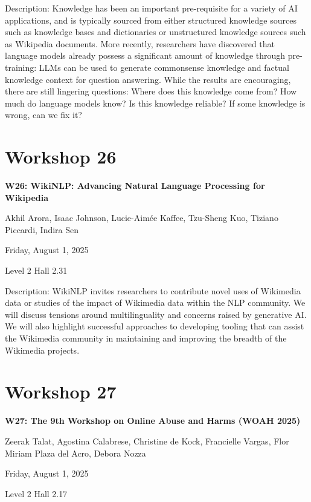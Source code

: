 Description: Knowledge has been an important pre-requisite for a variety of AI applications, and is typically sourced from either structured knowledge sources such as knowledge bases and dictionaries or unstructured knowledge sources such as Wikipedia documents. More recently, researchers have discovered that language models already possess a significant amount of knowledge through pre-training: LLMs can be used to generate commonsense knowledge and factual knowledge context for question answering. While the results are encouraging, there are still lingering questions: Where does this knowledge come from? How much do language models know? Is this knowledge reliable? If some knowledge is wrong, can we fix it?

\clearpage


\section[W26: WikiNLP: Advancing Natural Language Processing for Wikipedia]{Workshop 26}

\begin{center}
    {\Large \textbf{W26: WikiNLP: Advancing Natural Language Processing for Wikipedia}}

Akhil Arora, Isaac Johnson, Lucie-Aimée Kaffee, Tzu-Sheng Kuo, Tiziano Piccardi, Indira Sen

    Friday, August 1, 2025

Level 2 Hall 2.31
    
\end{center}

Description: WikiNLP invites researchers to contribute novel uses of Wikimedia data or studies of the impact of Wikimedia data within the NLP community. We will discuss tensions around multilinguality and concerns raised by generative AI. We will also highlight successful approaches to developing tooling that can assist the Wikimedia community in maintaining and improving the breadth of the Wikimedia projects.

\clearpage


\section[W27: The 9th Workshop on Online Abuse and Harms (WOAH 2025) ]{Workshop 27}

\begin{center}
    {\Large \textbf{W27: The 9th Workshop on Online Abuse and Harms (WOAH 2025) }}

Zeerak Talat, Agostina Calabrese, Christine de Kock, Francielle Vargas, Flor Miriam Plaza del Acro, Debora Nozza

    Friday, August 1, 2025

Level 2 Hall 2.17

\end{center}

